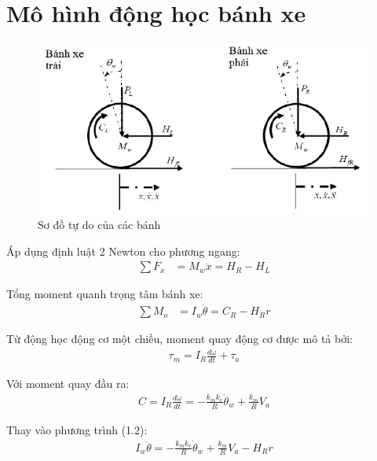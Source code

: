     \section{Mô hình động học bánh xe}
        \begin{figure}[H]
            \centering
            \includegraphics[width=1\textwidth]{pictures/wheel.png} 
            \caption{Sơ đồ tự do của các bánh}
        \end{figure}
        
        \hspace*{0.6cm}Áp dụng định luật 2 Newton cho phương ngang:
        \begin{align}
            \sum F_x &= M_w \ddot{x} = H_R - H_L 
        \end{align}
        
        Tổng moment quanh trọng tâm bánh xe:
        \begin{align}
            \sum M_o &= I_w \ddot{\theta} = C_R - H_R r 
        \end{align}
        
        Từ động học động cơ một chiều, moment quay động cơ được mô tả bởi:
        \begin{align}
            \tau_m = I_R \frac{d \omega}{dt} + \tau_a 
        \end{align}
        
        Với moment quay đầu ra:
        \begin{align}
            C = I_R \frac{d \omega}{dt} = -\frac{k_m k_e}{R} \dot{\theta}_w + \frac{k_m}{R} V_a 
        \end{align}
        
        Thay vào phương trình (1.2):
        \begin{align}
            I_w \ddot{\theta} = -\frac{k_m k_e}{R} \dot{\theta}_w + \frac{k_m}{R} V_a - H_R r 
        \end{align}
        
